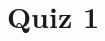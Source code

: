 \documentclass[12pt,group,answers]{quiz}
\title{Quiz 1}
\begin{document}
  \addtitle 

  \begin{questions}
    \begin{parts}
    \end{parts}
  \end{questions}
\end{document}
